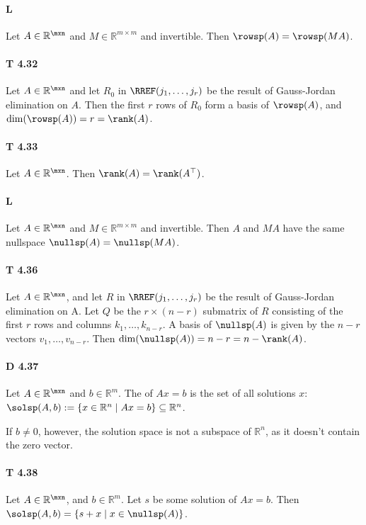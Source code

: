 \paragraph{L} Let $A\in\mathbb{R}^{\mxn}$ and
$M\in\mathbb{R}^{m\times m}$ and invertible. Then $\rowsp(A)=\rowsp(MA)$.

\paragraph{T 4.32} Let $A\in\mathbb{R}^{\mxn}$ and let $R_0$ in
$\RREF(j_1,\dots,j_r)$ be the result of Gauss-Jordan elimination on $A$. Then
the first $r$ rows of $R_0$ form a basis of $\rowsp(A)$, and $\dim(\rowsp(A))=r=\rank(A)$.

\paragraph{T 4.33} Let $A\in\mathbb{R}^{\mxn}$. Then $\rank(A)=\rank(A^\top)$.

\paragraph{L} Let $A\in\mathbb{R}^{\mxn}$ and
$M\in\mathbb{R}^{m\times m}$ and invertible. Then $A$ and $MA$ have the same
nullspace $\nullsp(A)=\nullsp(MA)$.

\paragraph{T 4.36} Let $A\in\mathbb{R}^{\mxn}$, and let $R$ in
$\RREF(j_1,\dots,j_r)$ be the result of Gauss-Jordan elimination on A. Let $Q$ be the $r\times (n-r)$ submatrix of $R$ consisting of the first $r$
rows and columns $k_1,\dots,k_{n-r}$. A basis of $\nullsp(A)$ is given by the $n-r$ vectors $v_1,\dots,v_{n-r}$. Then $\dim(\nullsp(A))=n-r=n-\rank(A)$.

\paragraph{D 4.37} Let $A\in\mathbb{R}^{\mxn}$ and
$b\in\mathbb{R}^m$. The  of $Ax=b$ is the
set of all solutions $x$: $\solsp(A,b):=\{x\in\mathbb{R}^n\mid Ax=b\}\subseteq\mathbb{R}^n$.

If $b\not=0$, however, the solution space is not a subspace of $\mathbb{R}^n$,
as it doesn't contain the zero vector.

\paragraph{T 4.38} Let $A\in\mathbb{R}^{\mxn}$, and
$b\in\mathbb{R}^m$. Let $s$ be some solution of $Ax=b$.
Then $\solsp(A,b)=\{s+x\mid x\in\nullsp(A)\}$.

